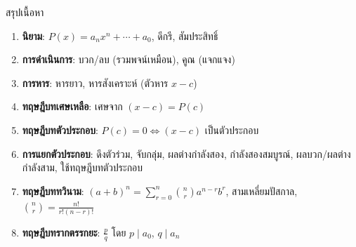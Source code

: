 \documentclass[11pt, aspectratio=169]{beamer}
\begin{document}
\begin{frame}{สรุปเนื้อหา}
  \begin{explanation}[สิ่งที่ได้เรียนรู้]
    \begin{enumerate}
      \item \textbf{นิยาม}: $P(x) = a_nx^n + \cdots + a_0$, ดีกรี, สัมประสิทธิ์
      \item \textbf{การดำเนินการ}: บวก/ลบ (รวมพจน์เหมือน), คูณ (แจกแจง)
      \item \textbf{การหาร}: หารยาว, หารสังเคราะห์ (ตัวหาร $x-c$)
      \item \textbf{ทฤษฎีบทเศษเหลือ}: เศษจาก $(x-c) = P(c)$
      \item \textbf{ทฤษฎีบทตัวประกอบ}: $P(c)=0 \iff (x-c)$ เป็นตัวประกอบ
      \item \textbf{การแยกตัวประกอบ}: ดึงตัวร่วม, จับกลุ่ม, ผลต่างกำลังสอง,
            กำลังสองสมบูรณ์, ผลบวก/ผลต่างกำลังสาม, ใช้ทฤษฎีบทตัวประกอบ
      \item \textbf{ทฤษฎีบททวินาม}: $(a+b)^n = \sum_{r=0}^{n} \binom{n}{r}a^{n-r}b^r$,
            สามเหลี่ยมปัสกาล, $\binom{n}{r} = \frac{n!}{r!(n-r)!}$
      \item \textbf{ทฤษฎีบทรากตรรกยะ}: $\frac{p}{q}$ โดย $p \mid a_0$, $q \mid a_n$
    \end{enumerate}
  \end{explanation}
\end{frame}
\end{document}
